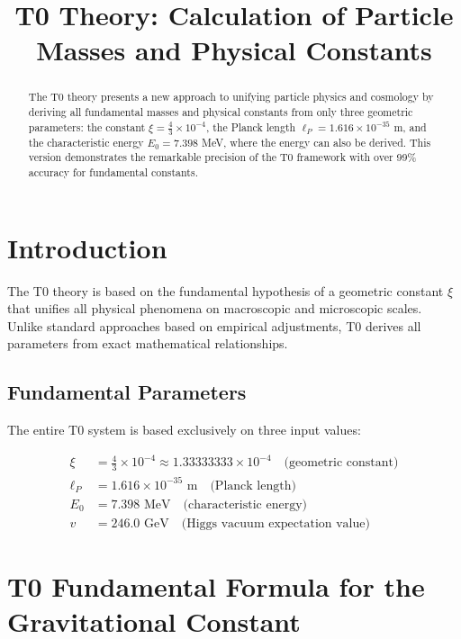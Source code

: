 \documentclass[12pt,a4paper]{report}
\begin{document}
	
	\title{\textbf{T0 Theory: Calculation of Particle Masses and Physical Constants}}
	\author{}
	\date{}
	
	\maketitle
	
	\begin{abstract}
		The T0 theory presents a new approach to unifying particle physics and cosmology by deriving all fundamental masses and physical constants from only three geometric parameters: the constant $\xi = \frac{4}{3} \times 10^{-4}$, the Planck length $\ell_P = 1.616 \times 10^{-35}$ m, and the characteristic energy $E_0 = 7.398$ MeV, where the energy can also be derived. This version demonstrates the remarkable precision of the T0 framework with over 99\% accuracy for fundamental constants.
	\end{abstract}
	
	\tableofcontents
	
	\section{Introduction}
	
	The T0 theory is based on the fundamental hypothesis of a geometric constant $\xi$ that unifies all physical phenomena on macroscopic and microscopic scales. Unlike standard approaches based on empirical adjustments, T0 derives all parameters from exact mathematical relationships.
	
	\subsection{Fundamental Parameters}
	
	The entire T0 system is based exclusively on three input values:
	
	\begin{align}
		\xi &= \frac{4}{3} \times 10^{-4} \approx 1.33333333 \times 10^{-4} \quad \text{(geometric constant)} \\
		\ell_P &= 1.616 \times 10^{-35} \text{ m} \quad \text{(Planck length)} \\
		E_0 &= 7.398 \text{ MeV} \quad \text{(characteristic energy)} \\
		v &= 246.0 \text{ GeV} \quad \text{(Higgs vacuum expectation value)}
	\end{align}
	
	\section{T0 Fundamental Formula for the Gravitational Constant}
	
\end{document}
